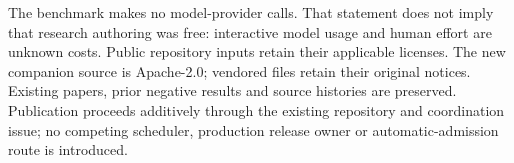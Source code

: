 \documentclass[11pt,a4paper]{article}
\begin{document}
The benchmark makes no model-provider calls. That statement does not imply that research authoring was free: interactive model usage and human effort are unknown costs. Public repository inputs retain their applicable licenses. The new companion source is Apache-2.0; vendored files retain their original notices. Existing papers, prior negative results and source histories are preserved. Publication proceeds additively through the existing repository and coordination issue; no competing scheduler, production release owner or automatic-admission route is introduced.



\end{document}
